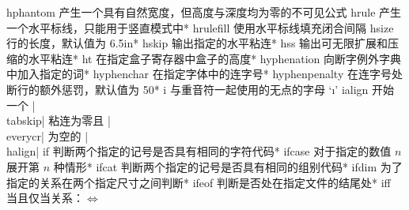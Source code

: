 \capcs hphantom {产生一个具有自然宽度，但高度与深度均为零的不可见公式}{}{}
\capcs hrule {产生一个水平标线，只能用于竖直模式中}*{}
\capcs hrulefill {使用水平标线填充闭合间隔}{}{}
\capcs hsize {行的长度，默认值为 6.5\thinspace in}*{}
\capcs hskip {输出指定的水平粘连}*{}
\capcs hss {输出可无限扩展和压缩的水平粘连}*{}
\capcs ht {在指定盒子寄存器中盒子的高度}*{}
\capcs hyphenation {向断字例外字典中加入指定的词}*{}
\capcs hyphenchar {在指定字体中的连字号}*{}
\capcs hyphenpenalty {在连字号处断行的额外惩罚，默认值为 50}*{}
\capcs i {与重音符一起使用的无点的字母 `\i'}{}{}
\capcs ialign {开始一个 |\\tabskip| 粘连为零且 |\\everycr| 为空的 |\\halign|}{}{}
\capcs if {判断两个指定的记号是否具有相同的字符代码}*{\@if}
\capcs ifcase {对于指定的数值 $n$ 展开第 $n$ 种情形}*{\@ifcase}
\capcs ifcat {判断两个指定的记号是否具有相同的组别代码}*{\@ifcat}
\capcs ifdim {为了指定的关系在两个指定尺寸之间判断}*{\@ifdim}
\capcs ifeof {判断是否处在指定文件的结尾处}*{\@ifeof}
\capcs iff {当且仅当关系：$\iff$}{}{}
